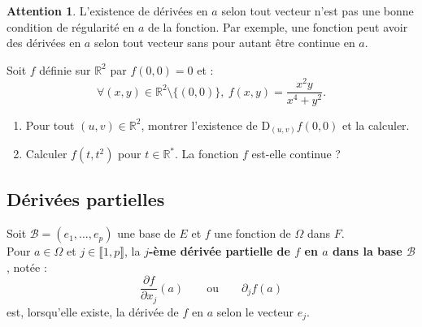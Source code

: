 \documentclass[french]{article}
\newcommand{\R}{\mathbb{R}}
\newcommand{\st}{^*}
\newcommand{\D}{\text{D}}
\theoremstyle{plain}
\theoremstyle{definition}
\newtheorem*{attention}{Attention}
\theoremstyle{remark}
\begin{document}
\begin{attention}
	L'existence de dérivées en $a$ selon tout vecteur n'est pas une bonne condition de régularité en $a$ de la fonction. Par exemple, une fonction peut avoir des dérivées en $a$ selon tout vecteur sans pour autant être continue en $a$.
\end{attention}

\begin{exo}
	Soit $f$ définie sur $\R^2$ par $f(0,0)=0$ et : 
	$$\forall (x,y)\in\R^2\setminus\{(0,0)\},\ f(x,y)=\frac{x^2y}{x^4+y^2}.$$
	\begin{enumerate}
		\item Pour tout $(u,v)\in\R^2$, montrer l'existence de $\D_{(u,v)}f(0,0)$ et la calculer.
		\item Calculer $f(t,t^2)$ pour $t\in\R\st$. La fonction $f$ est-elle continue ?
	\end{enumerate}
\end{exo}

\subsection{Dérivées partielles}

\begin{dfn}
	Soit $\mathcal{B}=(e_1,\ldots,e_p)$ une base de $E$ et $f$ une fonction de $\Omega$ dans $F$.\\
	Pour $a\in\Omega$ et $j\in\llbracket1,p\rrbracket$, la \textbf{$j$-ème dérivée partielle de $f$ en $a$ dans la base $\mathcal{B}$}, notée :
	$$\frac{\partial f}{\partial x_j}(a)\quad\quad\text{ou}\quad\quad \partial_jf(a)$$ est, lorsqu'elle existe, la dérivée de $f$ en $a$ selon le vecteur $e_j$.
\end{dfn}
\end{document}
